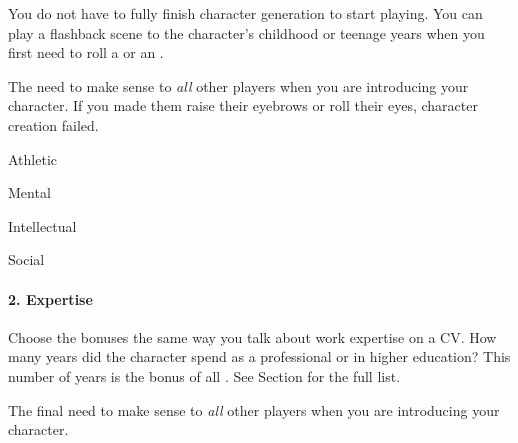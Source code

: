 \begin{marginNote}
	You do not have to fully finish character generation to start playing.
	You can play a flashback scene to the character's childhood or teenage
	years when you first need to roll a  or
	an .
\end{marginNote}

\begin{emphasisParagraph}
The  need to make sense to \emph{all} other players
when you are introducing your character.
If you made them raise their eyebrows or roll their eyes,
character creation failed.
\end{emphasisParagraph}


\begin{capabilitiesTable}{Athletic}
\end{capabilitiesTable}
\begin{capabilitiesTable}{Mental}
\end{capabilitiesTable}
\begin{capabilitiesTable}{Intellectual}
\end{capabilitiesTable}
\begin{capabilitiesTable}{Social}
\end{capabilitiesTable}

\paragraph*{2. Expertise}

\begin{marginNote}
	
\end{marginNote}
Choose the bonuses the same way you talk about work expertise on a CV.
How many years did the character spend as a professional or in higher education?
This number of years is the bonus of all .
See Section  for the full list.

The final  need to make sense to \emph{all} other players
when you are introducing your character.\par




